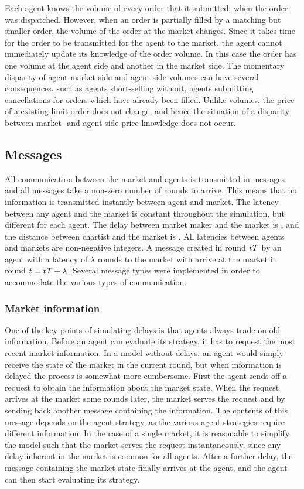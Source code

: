 Each agent knows the volume of every order that it submitted, when the order was dispatched. However, when an order is partially filled by a matching but smaller order, the volume of the order at the market changes. Since it takes time for the order to be transmitted for the agent to the market, the agent cannot immediately update its knowledge of the order volume. In this case the order has one volume at the agent side and another in the market side. The momentary disparity of agent market side and agent side volumes can have several consequences, such as agents short-selling without, agents submitting cancellations for orders which have already been filled. Unlike volumes, the price of a existing limit order does not change, and hence the situation of a disparity between market- and agent-side price knowledge does not occur.





\subsection{Messages}
All communication between the market and agents is transmitted in messages and all messages take a non-zero number of rounds to arrive. This means that no information is transmitted instantly between agent and market. The latency between any agent and the market is constant throughout the simulation, but different for each agent. The delay between market maker  and the market is , and the distance between chartist  and the market is . All latencies between agents and markets are non-negative integers. A message created in round $t_{}{T}$ by an agent with a latency of $\lambda$ rounds to the market with arrive at the market in round $t_{} = t_{}{T} + \lambda$. Several message types were implemented in order to accommodate the various types of communication.


\subsubsection{Market information}
One of the key points of simulating delays is that agents always trade on old information. Before an agent can evaluate its strategy, it has to request the most recent market information. In a model without delays, an agent would simply receive the state of the market in the current round, but when information is delayed the process is somewhat more cumbersome. First the agent sends off a request to obtain the information about the market state. When the request arrives at the market some rounds later, the market serves the request and by sending back another message containing the information. The contents of this message depends on the agent strategy, as the various agent strategies require different information. 
In the case of a single market, it is reasonable to simplify the model such that the market serves the request instantaneously, since any delay inherent in the market is common for all agents. 
After a further delay, the message containing the market state finally arrives at the agent, and the agent can then start evaluating its strategy. 


